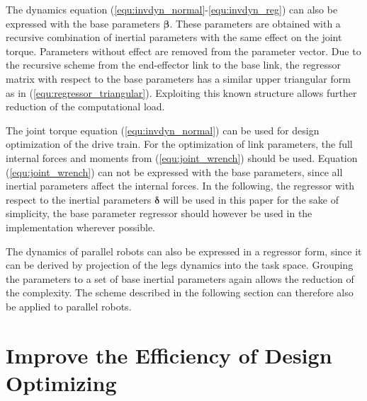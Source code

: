 \documentclass{svproc}
\newcommand{\bm}[1]{\boldsymbol{#1}}
\begin{document}
The dynamics equation (\ref{equ:invdyn_normal}-\ref{equ:invdyn_reg}) can also be expressed with the base parameters $\bm{\beta}$.
These parameters are obtained with a recursive combination of inertial parameters with the same effect on the joint torque.
Parameters without effect are removed from the parameter vector.
Due to the recursive scheme from the end-effector link to the base link, the regressor matrix with respect to the base parameters has a similar upper triangular form as in (\ref{equ:regressor_triangular}).
Exploiting this known structure allows further reduction of the computational load.

The joint torque equation (\ref{equ:invdyn_normal}) can be used for design optimization of the drive train.
For the optimization of link parameters, the full internal forces and moments from (\ref{equ:joint_wrench}) should be used.
Equation (\ref{equ:joint_wrench}) can not be expressed with the base parameters, since all inertial parameters affect the internal forces.
In the following, the regressor with respect to the inertial parameters $\bm{\delta}$ will be used in this paper for the sake of simplicity, the base parameter regressor should however be used in the implementation wherever possible.

The dynamics of parallel robots can also be expressed in a regressor form, since it can be derived by projection of the legs dynamics into the task space.
Grouping the parameters to a set of base inertial parameters again allows the reduction of the complexity.
The scheme described in the following section can therefore also be applied to parallel robots.

\section{Improve the Efficiency of Design Optimizing}
\label{sec:DesOptImprove}
\end{document}
